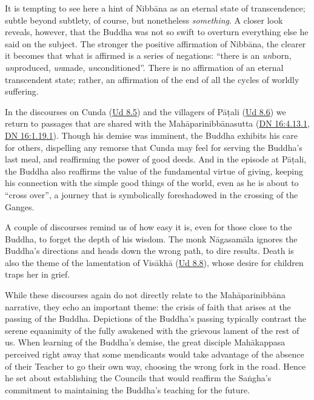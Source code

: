 \documentclass[12pt,openany]{book}%
\begin{document}
It is tempting to see here a hint of \textsanskrit{Nibbāna} as an eternal state of transcendence; subtle beyond subtlety, of course, but nonetheless \emph{something}. A closer look reveals, however, that the Buddha was not so swift to overturn everything else he said on the subject. The stronger the positive affirmation of \textsanskrit{Nibbāna}, the clearer it becomes that what is affirmed is a series of negations: “there is an \emph{un}born, \emph{un}produced, \emph{un}made, \emph{un}conditioned”. There is no affirmation of an eternal transcendent state; rather, an affirmation of the end of all the cycles of worldly suffering.

In the discourses on Cunda (\href{https://suttacentral.net/ud8.5/en/sujato}{Ud 8.5}) and the villagers of \textsanskrit{Pāṭali} (\href{https://suttacentral.net/ud8.6/en/sujato}{Ud 8.6}) we return to passages that are shared with the \textsanskrit{Mahāparinibbānasutta} (\href{https://suttacentral.net/dn16/en/sujato\#4.13.1}{DN 16:4.13.1}, \href{https://suttacentral.net/dn16/en/sujato\#1.19.1}{DN 16:1.19.1}). Though his demise was imminent, the Buddha exhibits his care for others, dispelling any remorse that Cunda may feel for serving the Buddha’s last meal, and reaffirming the power of good deeds. And in the episode at \textsanskrit{Pāṭali}, the Buddha also reaffirms the value of the fundamental virtue of giving, keeping his connection with the simple good things of the world, even as he is about to “cross over”, a journey that is symbolically foreshadowed in the crossing of the Ganges. 

A couple of discourses remind us of how easy it is, even for those close to the Buddha, to forget the depth of his wisdom. The monk \textsanskrit{Nāgasamāla} ignores the Buddha’s directions and heads down the wrong path, to dire results. Death is also the theme of the lamentation of \textsanskrit{Visākhā} (\href{https://suttacentral.net/ud8.8/en/sujato}{Ud 8.8}), whose desire for children traps her in grief. 

While these discourses again do not directly relate to the \textsanskrit{Mahāparinibbāna} narrative, they echo an important theme: the crisis of faith that arises at the passing of the Buddha. Depictions of the Buddha’s passing typically contrast the serene equanimity of the fully awakened with the grievous lament of the rest of us. When learning of the Buddha’s demise, the great disciple \textsanskrit{Mahākappasa} perceived right away that some mendicants would take advantage of the absence of their Teacher to go their own way, choosing the wrong fork in the road. Hence he set about establishing the Councils that would reaffirm the \textsanskrit{Saṅgha}’s commitment to maintaining the Buddha’s teaching for the future.
\end{document}
